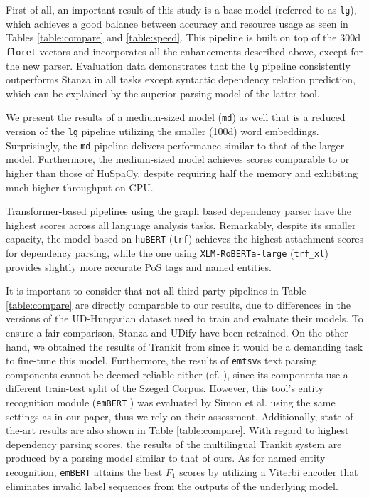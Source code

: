 \documentclass[runningheads,a4paper]{llncs}
\newcommand{\huspacy}{HuSpaCy}
\newcommand{\emtsv}{\texttt{emtsv}}
\newcommand{\stanza}{Stanza}
\newcommand{\trankit}{Trankit}
\newcommand{\udify}{UDify}
\newcommand{\udhu}{UD-Hungarian}
\newcommand{\szegedcorpus}{Szeged Corpus}
\newcommand{\floret}{\texttt{floret}}
\newcommand{\fone}{$F_1$}
\newcommand{\hubert}{\texttt{huBERT}}
\newcommand{\embert}{\texttt{emBERT}}
\newcommand{\xlmroberta}{\texttt{XLM-RoBERTa-large}}
\newcommand{\huspacylg}{\texttt{lg}}
\newcommand{\huspacymd}{\texttt{md}}
\newcommand{\huspacytrf}{\texttt{trf}}
\newcommand{\huspacytrfxl}{\texttt{trf\_xl}}
\begin{document}
First of all, an important result of this study is a base model (referred to as \huspacylg), which achieves a good balance between accuracy and resource usage as seen in Tables \ref{table:compare} and \ref{table:speed}. This pipeline is built on top of the 300d \floret{} vectors and incorporates all the enhancements described above, except for the new parser. Evaluation data demonstrates that the \huspacylg{} pipeline consistently outperforms \stanza{} in all tasks except syntactic dependency relation prediction, which can be explained by the superior parsing model of the latter tool. 

We present the results of a medium-sized model (\huspacymd) as well that is a reduced version of the \huspacylg{} pipeline utilizing the smaller (100d) word embeddings. Surprisingly, the \huspacymd{} pipeline delivers performance similar to that of the larger model. Furthermore, the medium-sized model achieves scores comparable to or higher than those of \huspacy, despite requiring half the memory and exhibiting much higher throughput on CPU. 

Transformer-based pipelines using the graph based dependency parser have the highest scores across all language analysis tasks. Remarkably, despite its smaller capacity, the model based on \hubert{} (\huspacytrf) achieves the highest attachment scores for dependency parsing, while the one using \xlmroberta{} (\huspacytrfxl) provides slightly more accurate PoS tags and named entities.

It is important to consider that not all third-party pipelines in Table \ref{table:compare} are directly comparable to our results, due to differences in the versions of the \udhu{} dataset used to train and evaluate their models. To ensure a fair comparison, \stanza{} and \udify{} have been retrained. On the other hand, we obtained the results of \trankit{} from \cite{van2021trankit} since it would be a demanding task to fine-tune this model. Furthermore, the results of \emtsv\textquotesingle s text parsing components \cite{orosz-novak-2013-purepos,novak2014new,novak-etal-2016-new} cannot be deemed reliable either (cf. \cite{huspacy:2021}), since its components use a different train-test split of the \szegedcorpus. However, this tool’s entity recognition module (\embert{} \cite{embert}) was evaluated by Simon et al. \cite{nerkoreval} using the same settings as in our paper, thus we rely on their assessment. Additionally, state-of-the-art results are also shown in Table \ref{table:compare}. With regard to highest dependency parsing scores, the results of the multilingual \trankit{} system are produced by a parsing model similar to that of ours. As for named entity recognition, \embert{} attains the best \fone{} scores by utilizing a Viterbi encoder that eliminates invalid label sequences from the outputs of the underlying model.
\end{document}
